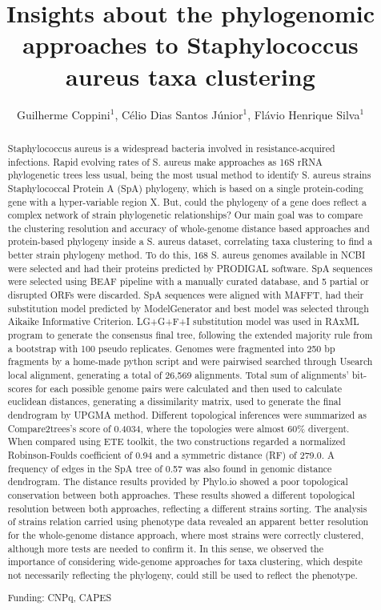 \documentclass[twoside]{article}
\title{\vspace{-15mm}\fontsize{24pt}{10pt}\selectfont\textbf{Insights about the phylogenomic approaches to Staphylococcus aureus taxa clustering}} %
\author{Guilherme Coppini$^1$, C\'elio Dias Santos J\'unior$^1$, Fl\'avio Henrique Silva$^1$}
\affil{1 FEDERAL UNIVERSITY OF S\~AO CARLOS\\ }
\date{}
\begin{document}
\maketitle %

\thispagestyle{fancy} %


\begin{abstract}
Staphylococcus aureus is a widespread bacteria involved in resistance-acquired infections. Rapid evolving rates of S. aureus make approaches as 16S rRNA phylogenetic trees less usual, being the most usual method to identify S. aureus strains Staphylococcal Protein A  (SpA) phylogeny, which is based on a single protein-coding gene with a hyper-variable region X. But, could the phylogeny of  a gene does reflect a complex network of strain phylogenetic relationships? Our main goal was to compare the clustering resolution and accuracy of whole-genome distance based approaches and protein-based phylogeny inside a S. aureus dataset, correlating taxa clustering to find a better strain phylogeny method. To do this, 168 S. aureus genomes available in NCBI were selected and had their proteins predicted by PRODIGAL software. SpA sequences were selected using BEAF pipeline with a manually curated database, and 5 partial or disrupted ORFs were discarded. SpA sequences were aligned with MAFFT, had their substitution model predicted by ModelGenerator and best model was selected through Aikaike Informative Criterion. LG+G+F+I substitution model was used in RAxML program to generate the consensus final tree, following the extended majority rule from a bootstrap with 100 pseudo replicates. Genomes were fragmented into 250 bp fragments by a home-made python script and were pairwised searched through Usearch local alignment, generating a total of 26,569 alignments. Total sum of alignments' bit-scores for each possible genome pairs were calculated and then used to calculate euclidean distances, generating a dissimilarity matrix, used to generate the final dendrogram by UPGMA method. Different topological inferences were summarized as Compare2trees's score of 0.4034, where the topologies were almost 60\% divergent. When compared using ETE toolkit, the two constructions regarded a normalized Robinson-Foulds coefficient of 0.94 and a symmetric distance (RF) of 279.0. A frequency of edges in the SpA tree of 0.57 was also found in genomic distance dendrogram. The distance results provided by Phylo.io showed a poor topological conservation between both approaches. These results showed a different topological resolution between both approaches, reflecting a different strains sorting. The analysis of strains relation carried using phenotype data revealed an apparent better resolution for the whole-genome distance approach, where most strains were correctly clustered, although more tests are needed to  confirm it. In this sense, we observed the importance of considering wide-genome approaches for taxa clustering, which despite not necessarily reflecting the phylogeny, could still be used to reflect the phenotype.

Funding: CNPq, CAPES
\end{abstract}
\end{document}
